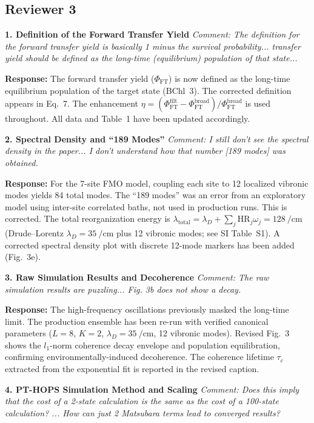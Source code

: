 \documentclass[11pt]{article}
\begin{document}
\subsection*{Reviewer 3}

\textbf{1. Definition of the Forward Transfer Yield}
\textit{Comment: The definition for the forward transfer yield is basically 1 minus the survival probability... transfer yield should be defined as the long-time (equilibrium) population of that state...}

\textbf{Response:} The forward transfer yield ($\Phi_{\mathrm{FT}}$) is now defined as the long-time equilibrium population of the target state (BChl~3). The corrected definition appears in Eq.~7. The enhancement $\eta = (\Phi_{\mathrm{FT}}^{\mathrm{filt}} - \Phi_{\mathrm{FT}}^{\mathrm{broad}})/\Phi_{\mathrm{FT}}^{\mathrm{broad}}$ is used throughout. All data and Table~1 have been updated accordingly.

\textbf{2. Spectral Density and ``189 Modes''}
\textit{Comment: I still don't see the spectral density in the paper... I don't understand how that number [189 modes] was obtained.}

\textbf{Response:} For the 7-site FMO model, coupling each site to 12 localized vibronic modes yields 84 total modes. The ``189 modes'' was an error from an exploratory model using inter-site correlated baths, not used in production runs. This is corrected. The total reorganization energy is $\lambda_{\mathrm{total}} = \lambda_D + \sum_j \mathrm{HR}_j \omega_j = \SI{128}{\per\centi\meter}$ (Drude--Lorentz $\lambda_D = \SI{35}{\per\centi\meter}$ plus 12 vibronic modes; see SI Table~S1). A corrected spectral density plot with discrete 12-mode markers has been added (Fig.~3e).

\textbf{3. Raw Simulation Results and Decoherence}
\textit{Comment: The raw simulation results are puzzling... Fig. 3b does not show a decay.}

\textbf{Response:} The high-frequency oscillations previously masked the long-time limit. The production ensemble has been re-run with verified canonical parameters ($L=8$, $K=2$, $\lambda_D = \SI{35}{\per\centi\meter}$, 12 vibronic modes). Revised Fig.~3 shows the $l_1$-norm coherence decay envelope and population equilibration, confirming environmentally-induced decoherence. The coherence lifetime $\tau_c$ extracted from the exponential fit is reported in the revised caption.

\textbf{4. PT-HOPS Simulation Method and Scaling}
\textit{Comment: Does this imply that the cost of a 2-state calculation is the same as the cost of a 100-state calculation? ... How can just 2 Matsubara terms lead to converged results?}
\end{document}
